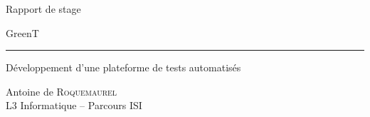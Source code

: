 
	
	\centering
	\vspace*{4.2cm}
	\par\normalfont\fontsize{45}{45}\sffamily\selectfont
	
	Rapport de stage
	
	\Large{GreenT}
	
	\rule{\textwidth}{1pt}
	
	\Huge{Développement d'une plateforme de tests automatisés}\par
	
	\vspace*{1cm}
	{\huge Antoine de \textsc{Roquemaurel}\\
	\Large{L3 Informatique -- Parcours ISI}}\par
	\vfill
	
